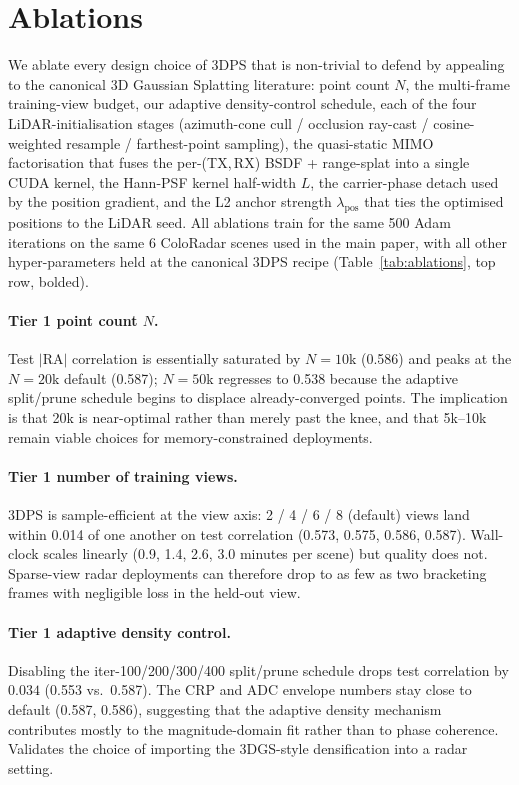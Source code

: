 \section{Ablations}
\label{app:ablations}

We ablate every design choice of 3DPS that is non-trivial to defend by appealing to the canonical 3D Gaussian Splatting literature: point count $N$, the multi-frame training-view budget, our adaptive density-control schedule, each of the four LiDAR-initialisation stages (azimuth-cone cull / occlusion ray-cast / cosine-weighted resample / farthest-point sampling), the quasi-static MIMO factorisation that fuses the per-(TX,\,RX) BSDF + range-splat into a single CUDA kernel, the Hann-PSF kernel half-width $L$, the carrier-phase detach used by the position gradient, and the L2 anchor strength $\lambda_{\mathrm{pos}}$ that ties the optimised positions to the LiDAR seed. All ablations train for the same 500 Adam iterations on the same 6 ColoRadar scenes used in the main paper, with all other hyper-parameters held at the canonical 3DPS recipe (Table~\ref{tab:ablations}, top row, bolded).



\paragraph{Tier 1 \textemdash{} point count $N$.} Test $|\mathrm{RA}|$ correlation is essentially saturated by $N{=}10$k (0.586) and peaks at the $N{=}20$k default (0.587); $N{=}50$k regresses to 0.538 because the adaptive split/prune schedule begins to displace already-converged points. The implication is that 20k is near-optimal rather than merely past the knee, and that 5k--10k remain viable choices for memory-constrained deployments.

\paragraph{Tier 1 \textemdash{} number of training views.} 3DPS is sample-efficient at the view axis: 2 / 4 / 6 / 8 (default) views land within 0.014 of one another on test correlation (0.573, 0.575, 0.586, 0.587). Wall-clock scales linearly (0.9, 1.4, 2.6, 3.0 minutes per scene) but quality does not. Sparse-view radar deployments can therefore drop to as few as two bracketing frames with negligible loss in the held-out view.

\paragraph{Tier 1 \textemdash{} adaptive density control.} Disabling the iter-100/200/300/400 split/prune schedule drops test correlation by $0.034$ (0.553 vs.~0.587). The CRP and ADC envelope numbers stay close to default (0.587, 0.586), suggesting that the adaptive density mechanism contributes mostly to the magnitude-domain fit rather than to phase coherence. Validates the choice of importing the 3DGS-style densification into a radar setting.

